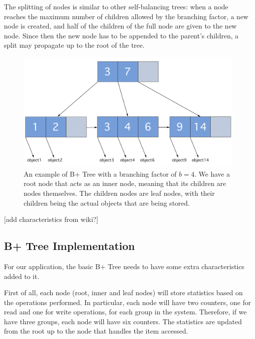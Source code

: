 The splitting of nodes is similar to other self-balancing trees: when a node reaches the maximum number of children allowed by the branching factor, a new node is created, and half of the children of the full node are given to the new node. Since then the new node has to be appended to the parent's children, a split may propagate up to the root of the tree.

\begin{figure}[!htb]
    \centering
    \includegraphics[width=\textwidth,height=\textheight,keepaspectratio]{img/b+tree.png}
    \caption[caption]{ An example of B+ Tree with a branching factor of $b=4$. We have a root node that acts as an inner node, meaning that its children are nodes themselves. The children nodes are leaf nodes, with their children being the actual objects that are being stored. }
    \label{fig:b+tree}
\end{figure}

[add characteristics from wiki?]

\subsection{B+ Tree Implementation}\label{sec:b+tree-implementation}
For our application, the basic B+ Tree needs to have some extra characteristics added to it. 

First of all, each node (root, inner and leaf nodes) will store statistics based on the operations performed. In particular, each node will have two counters, one for read and one for write operations, for each group in the system. Therefore, if we have three groups, each node will have six counters. The statistics are updated from the root up to the node that handles the item accessed. 

